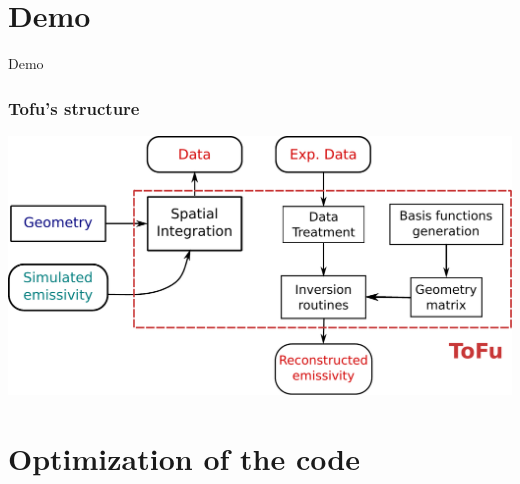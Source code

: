 \documentclass[10pt]{beamer}
\begin{document}
\section{Demo}

{
\begin{frame}[standout]
  Demo
\end{frame}
}

\begin{frame}
\frametitle{Tofu's structure}

\begin{center}
    	\includegraphics[width=0.8\linewidth]{figures/tofu.pdf}
\end{center}
	
\end{frame}

\section{Optimization of the code}
\end{document}
